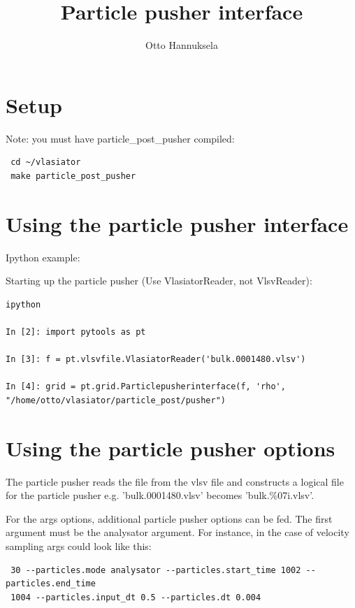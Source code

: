 \documentclass[a4paper,10pt]{article}
\title{Particle pusher interface}
\author{Otto Hannuksela}
\begin{document}
\maketitle

\tableofcontents

\newpage

\section{Setup}

Note: you must have particle\_post\_pusher compiled:

\begin{verbatim}
 cd ~/vlasiator
 make particle_post_pusher
\end{verbatim}


\section{Using the particle pusher interface}

Ipython example:

Starting up the particle pusher (Use VlasiatorReader, not VlsvReader):

\begin{verbatim}
ipython

In [2]: import pytools as pt

In [3]: f = pt.vlsvfile.VlasiatorReader('bulk.0001480.vlsv')

In [4]: grid = pt.grid.Particlepusherinterface(f, 'rho', 
"/home/otto/vlasiator/particle_post/pusher")
\end{verbatim}

\section{Using the particle pusher options}

The particle pusher reads the file from the vlsv file and constructs a logical file for the particle pusher e.g. 'bulk.0001480.vlsv' becomes 'bulk.\%07i.vlsv'.

For the args options, additional particle pusher options can be fed. The first argument must be the analysator argument. For instance, in the case of velocity sampling args could 
look like this:

\begin{verbatim}
 30 --particles.mode analysator --particles.start_time 1002 --particles.end_time 
 1004 --particles.input_dt 0.5 --particles.dt 0.004
\end{verbatim}
\end{document}
